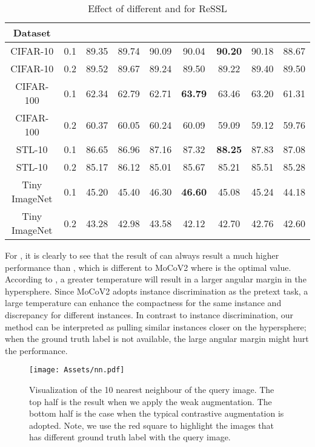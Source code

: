 \documentclass{article}
\newcommand{\<}{\left\langle}
\renewcommand{\>}{\right\rangle}
\begin{document}
\renewcommand\arraystretch{1.15}
\begin{table}[h]
 \centering
 \setlength\tabcolsep{5pt}
 \small
 \caption{Effect of different  and  for ReSSL}
 \vspace{-5pt}
 \label{table:ablation_t}
\begin{tabular}{c c c c c c c c c } 
\toprule 
Dataset        &  &  &  &  &  &  &  &  \\ \hline
CIFAR-10       & 0.1 & 89.35  & 89.74 & 90.09 & 90.04 & \textbf{90.20} & 90.18 & 88.67 \\
CIFAR-10       & 0.2 & 89.52  & 89.67 & 89.24 & 89.50 & 89.22 & 89.40 & 89.50 \\ \hline
CIFAR-100      & 0.1 & 62.34  & 62.79 & 62.71 & \textbf{63.79} & 63.46 & 63.20 & 61.31 \\
CIFAR-100      & 0.2 & 60.37  & 60.05 & 60.24 & 60.09 & 59.09 & 59.12 & 59.76 \\ \hline
STL-10         & 0.1 & 86.65  & 86.96 & 87.16 & 87.32 & \textbf{88.25} & 87.83 & 87.08 \\
STL-10         & 0.2 & 85.17  & 86.12 & 85.01 & 85.67 & 85.21 & 85.51 & 85.28 \\ \hline
Tiny ImageNet  & 0.1 & 45.20  & 45.40 & 46.30 & \textbf{46.60} & 45.08 & 45.24 & 44.18 \\
Tiny ImageNet  & 0.2 & 43.28  & 42.98 & 43.58 & 42.12 & 42.70 & 42.76 & 42.60 \\
\toprule 
\end{tabular}
\end{table}
For , it is clearly to see that the result of  can always result a much higher performance than , which is different to MoCoV2 where  is the optimal value. According to \cite{NormFace, CosFace, ArcFace}, a greater temperature will result in a larger angular margin in the hypersphere. Since MoCoV2 adopts instance discrimination as the pretext task, a large temperature can enhance the compactness for the same instance and discrepancy for different instances. In contrast to instance discrimination, our method can be interpreted as pulling similar instances closer on the hypersphere; when the ground truth label is not available, the large angular margin might hurt the performance.


\begin{figure}
    \centering
    \texttt{[image: Assets/nn.pdf]}
    \vspace{-10pt}
    \caption{Visualization of the 10 nearest neighbour of the query image. The top half is the result when we apply the weak augmentation. The bottom half is the case when the typical contrastive augmentation is adopted. Note, we use the red square to highlight the images that has different ground truth label with the query image.}
    \label{fig:nn}
    \vspace{-12pt}
\end{figure}
\end{document}
